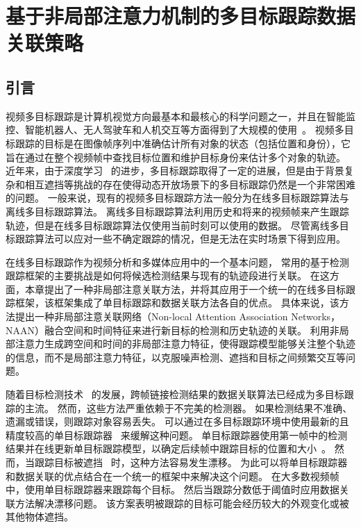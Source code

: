 
\chapter{ 基于非局部注意力机制的多目标跟踪数据关联策略} \label{chap:nonlocal}

\section{引言}
视频多目标跟踪是计算机视觉方向最基本和最核心的科学问题之一，并且在智能监控、智能机器人、无人驾驶车和人机交互等方面得到了大规模的使用~\cite{autonomous_vechicle}。
视频多目标跟踪的目标是在图像帧序列中准确估计所有对象的状态（包括位置和身份），它旨在通过在整个视频帧中查找目标位置和维护目标身份来估计多个对象的轨迹。
近年来，由于深度学习~\cite{b4} 的进步，多目标跟踪取得了一定的进展，但是由于背景复杂和相互遮挡等挑战的存在使得动态开放场景下的多目标跟踪仍然是一个非常困难的问题。
一般来说，现有的视频多目标跟踪方法一般分为在线多目标跟踪算法与离线多目标跟踪算法。
离线多目标跟踪算法利用历史和将来的视频帧来产生跟踪轨迹，但是在线多目标跟踪算法仅使用当前时刻可以使用的数据。
尽管离线多目标跟踪算法可以应对一些不确定跟踪的情况，但是无法在实时场景下得到应用。

在线多目标跟踪作为视频分析和多媒体应用中的一个基本问题，
常用的基于检测跟踪框架的主要挑战是如何将候选检测结果与现有的轨迹段进行关联。
在这方面，本章提出了一种非局部注意关联方法，并将其应用于一个统一的在线多目标跟踪框架，该框架集成了单目标跟踪和数据关联方法各自的优点。
具体来说，该方法提出一种非局部注意关联网络（Non-local Attention Association Networks，NAAN）融合空间和时间特征来进行新目标的检测和历史轨迹的关联。
利用非局部注意力生成跨空间和时间的非局部注意力特征，使得跟踪模型能够关注整个轨迹的信息，而不是局部注意力特征，以克服噪声检测、遮挡和目标之间频繁交互等问题。


随着目标检测技术~\cite{b8} 的发展，跨帧链接检测结果的数据关联算法已经成为多目标跟踪的主流。
然而，这些方法严重依赖于不完美的检测器。
如果检测结果不准确、遗漏或错误，则跟踪对象容易丢失。
可以通过在多目标跟踪环境中使用最新的且精度较高的单目标跟踪器~\cite{b10} 来缓解这种问题。
单目标跟踪器使用第一帧中的检测结果并在线更新单目标跟踪模型，以确定后续帧中跟踪目标的位置和大小~\cite{weight_based}。
然而，当跟踪目标被遮挡~\cite{local_sparse} 时，这种方法容易发生漂移。
为此可以将单目标跟踪器和数据关联的优点结合在一个统一的框架中来解决这个问题。
在大多数视频帧中，使用单目标跟踪器来跟踪每个目标。
然后当跟踪分数低于阈值时应用数据关联方法解决漂移问题。
该方案表明被跟踪的目标可能会经历较大的外观变化或被其他物体遮挡。

